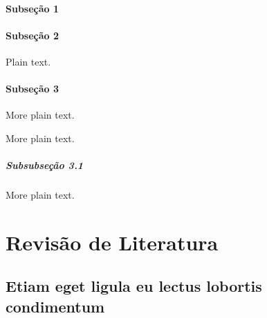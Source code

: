 \documentclass[12pt,oneside,a4paper]{abntex2}
\begin{document}
\subsection{Subseção 1}

\lipsum[8-10]

\subsection{Subseção 2}

Plain text.

\lipsum[11-15]

\subsection{Subseção 3}

More plain text.

\lipsum[16-20]

More plain text.

\subsubsection{Subsubseção 3.1}

More plain text.

\lipsum[21-25]


\part{Revisão de Literatura}


\chapter{Etiam eget ligula eu lectus lobortis condimentum}

\lipsum[1-1]
\end{document}
